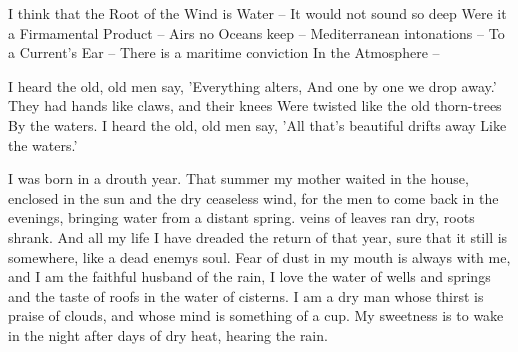 \documentclass[12pt, letterpaper]{report}
\begin{document}
\begin{poem}
\begin{stanza}
I think that the Root of the Wind is Water --\verseline
It would not sound so deep\verseline
Were it a Firmamental Product --\verseline
Airs no Oceans keep --\verseline
Mediterranean intonations --\verseline
To a Current's Ear --\verseline
There is a maritime conviction\verseline
In the Atmosphere --
\end{stanza}
\end{poem}

\clearpage

\author{William Butler Yeats}

\begin{poem}
\begin{stanza}
I heard the old, old men say,\verseline
'Everything alters,\verseline
And one by one we drop away.'\verseline
They had hands like claws, and their knees\verseline
Were twisted like the old thorn-trees\verseline
By the waters.\verseline
I heard the old, old men say,\verseline
'All that's beautiful drifts away\verseline
Like the waters.'
\end{stanza}
\end{poem}

\author{Wendell Berry}

\begin{poem}
\begin{stanza}
I was born in a drouth year. That summer\verseline
my mother waited in the house, enclosed\verseline
in the sun and the dry ceaseless wind,\verseline
for the men to come back in the evenings,\verseline
bringing water from a distant spring.\verseline
veins of leaves ran dry, roots shrank.\verseline
And all my life I have dreaded the return\verseline
of that year, sure that it still is\verseline
somewhere, like a dead enemys soul.\verseline
Fear of dust in my mouth is always with me,\verseline
and I am the faithful husband of the rain,\verseline
I love the water of wells and springs\verseline
and the taste of roofs in the water of cisterns.\verseline
I am a dry man whose thirst is praise\verseline
of clouds, and whose mind is something of a cup.\verseline
My sweetness is to wake in the night\verseline
after days of dry heat, hearing the rain.
\end{stanza}
\end{poem}

\author{Wendell Berry}
\end{document}
